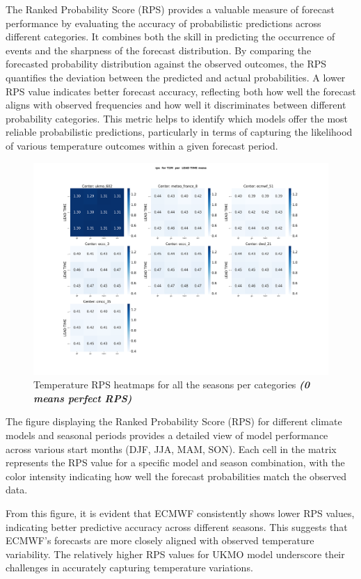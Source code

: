 The Ranked Probability Score (RPS) provides a valuable measure of forecast performance by evaluating the accuracy of probabilistic predictions across different categories. It combines both the skill in predicting the occurrence of events and the sharpness of the forecast distribution. By comparing the forecasted probability distribution against the observed outcomes, the RPS quantifies the deviation between the predicted and actual probabilities. A lower RPS value indicates better forecast accuracy, reflecting both how well the forecast aligns with observed frequencies and how well it discriminates between different probability categories. This metric helps to identify which models offer the most reliable probabilistic predictions, particularly in terms of capturing the likelihood of various temperature outcomes within a given forecast period.
\begin{figure}[H]
    \centering
    \includegraphics[width=1\linewidth]{plots/prob/rps/rps_T2M_mena.png}
    \caption{Temperature RPS  heatmaps for all the seasons per categories \textbf{\textit{(0 means perfect RPS)}}}
\end{figure}
The figure displaying the Ranked Probability Score (RPS) for different climate models and seasonal periods provides a detailed view of model performance across various start months (DJF, JJA, MAM, SON). Each cell in the matrix represents the RPS value for a specific model and season combination, with the color intensity indicating how well the forecast probabilities match the observed data.

From this figure, it is evident that ECMWF consistently shows lower RPS values, indicating better predictive accuracy across different seasons. This suggests that ECMWF's forecasts are more closely aligned with observed temperature variability. The relatively higher RPS values for  UKMO model underscore their challenges in accurately capturing temperature variations. 

